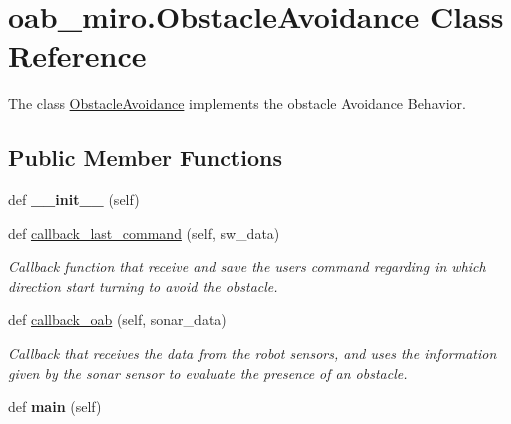 \hypertarget{classoab__miro_1_1ObstacleAvoidance}{}\section{oab\+\_\+miro.\+Obstacle\+Avoidance Class Reference}
\label{classoab__miro_1_1ObstacleAvoidance}


The class \mbox{\hyperlink{classoab__miro_1_1ObstacleAvoidance}{Obstacle\+Avoidance}} implements the obstacle Avoidance Behavior.  


\subsection*{Public Member Functions}
\begin{DoxyCompactItemize}
\item 
\mbox{\label{classoab__miro_1_1ObstacleAvoidance_a4c09f48116e03a2ada68ee1babd82a9e}} 
def {\bfseries \+\_\+\+\_\+init\+\_\+\+\_\+} (self)
\item 
\mbox{\label{classoab__miro_1_1ObstacleAvoidance_a1fa593e0b629518b392e37b64025a468}} 
def \mbox{\hyperlink{classoab__miro_1_1ObstacleAvoidance_a1fa593e0b629518b392e37b64025a468}{callback\+\_\+last\+\_\+command}} (self, sw\+\_\+data)
\begin{DoxyCompactList}\small\item\em Callback function that receive and save the user\textquotesingle{}s command regarding in which direction start turning to avoid the obstacle. \end{DoxyCompactList}\item 
def \mbox{\hyperlink{classoab__miro_1_1ObstacleAvoidance_a292e590575d7e28589a60b9c83776fb6}{callback\+\_\+oab}} (self, sonar\+\_\+data)
\begin{DoxyCompactList}\small\item\em Callback that receives the data from the robot sensors, and uses the information given by the sonar sensor to evaluate the presence of an obstacle. \end{DoxyCompactList}\item 
\mbox{\label{classoab__miro_1_1ObstacleAvoidance_a36b64da5042fa20d2ddb98778c798aae}} 
def {\bfseries main} (self)
\end{DoxyCompactItemize}
